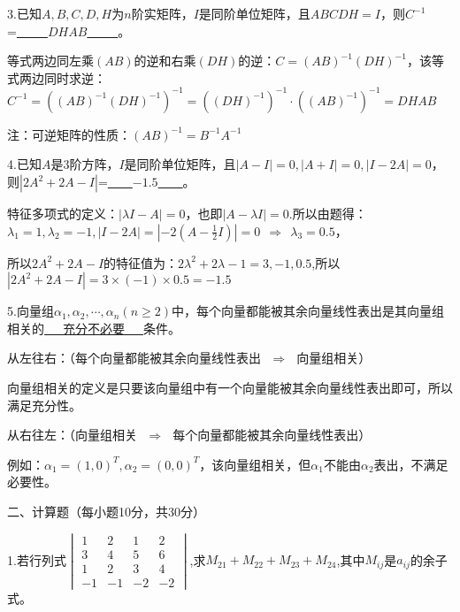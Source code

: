 \documentclass{article}
\begin{document}
3.已知$A,B,C,D,H$为$n$阶实矩阵，$I$是同阶单位矩阵，且$ABCDH=I$，则$C^{-1}$=\underline{~~~~~\textcolor[rgb]{1.00,0.00,0.00}{$DHAB$}~~~~~}。

\begin{jie}
等式两边同左乘$(AB)$的逆和右乘$(DH)$的逆：$C=(AB)^{-1}(DH)^{-1}$，该等式两边同时求逆：
$C^{-1}=((AB)^{-1}(DH)^{-1})^{-1}=((DH)^{-1})^{-1}\cdot((AB)^{-1})^{-1}=DHAB$

\textcolor[rgb]{1.00,0.00,0.00}{注：可逆矩阵的性质：$(AB)^{-1}=B^{-1}A^{-1}$}
\end{jie}

4.已知$A$是3阶方阵，$I$是同阶单位矩阵，且$|A-I|=0,|A+I|=0,|I-2A|=0$，则$|2A^2+2A-I|$=\underline{~~~~\textcolor[rgb]{1.00,0.00,0.00}{$-1.5$}~~~~}。

\begin{jie}
特征多项式的定义：$|\lambda I-A|=0$，也即$|A-\lambda I|=0$.所以由题得：
$\lambda_1=1,\lambda_2=-1,|I-2A|=|-2(A-\frac{1}{2}I)|=0~~\Rightarrow~~\lambda_3=0.5$，

所以$2A^2+2A-I$的特征值为：$2\lambda^2+2\lambda-1=3,-1,0.5$,所以$|2A^2+2A-I|=3\times(-1)\times0.5=-1.5$
\end{jie}

5.向量组$\alpha_1,\alpha_2,\cdots,\alpha_n(n\geq2)$中，每个向量都能被其余向量线性表出是其向量组相关的\underline{~~~\textcolor[rgb]{1.00,0.00,0.00}{充分不必要}~~~}条件。

\begin{jie}
从左往右：（每个向量都能被其余向量线性表出$~~~\Rightarrow~~~$向量组相关）

向量组相关的定义是只要该向量组中有一个向量能被其余向量线性表出即可，所以满足充分性。

从右往左：（向量组相关$~~~\Rightarrow~~~$每个向量都能被其余向量线性表出）

例如：$\alpha_1=(1,0)^T,\alpha_2=(0,0)^T$，该向量组相关，但$\alpha_1$不能由$\alpha_2$表出，不满足必要性。
\end{jie}

\hphantom{1}

二、计算题（每小题10分，共30分）

1.若行列式$
\begin{vmatrix}
  1 & 2 & 1 & 2\\
  3 & 4&5 & 6\\
  1 & 2 &3 & 4\\
  -1 & -1 &-2&-2
\end{vmatrix}$,求$M_{21}+M_{22}+M_{23}+M_{24}$,其中$M_{ij}$是$a_{ij}$的余子式。
\end{document}
